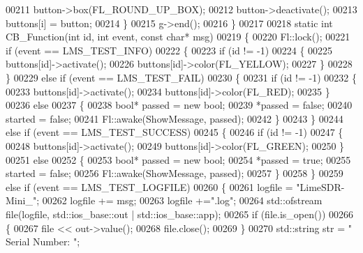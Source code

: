\begin{DoxyCode}
00211         button->box(FL\_ROUND\_UP\_BOX);
00212         button->deactivate();
00213         buttons[i] = button;
00214     \}
00215     g->end();
00216 \}
00217 
00218 \textcolor{keyword}{static} \textcolor{keywordtype}{int} CB\_Function(\textcolor{keywordtype}{int} \textcolor{keywordtype}{id}, \textcolor{keywordtype}{int} event, \textcolor{keyword}{const} \textcolor{keywordtype}{char}* msg)
00219 \{
00220     Fl::lock();
00221     \textcolor{keywordflow}{if} (event == LMS_TEST_INFO)
00222     \{
00223         \textcolor{keywordflow}{if} (\textcolor{keywordtype}{id} != -1)
00224         \{
00225             buttons[id]->activate();
00226             buttons[id]->color(FL\_YELLOW);
00227         \}
00228     \}
00229     \textcolor{keywordflow}{else} \textcolor{keywordflow}{if} (event == LMS_TEST_FAIL)
00230     \{
00231         \textcolor{keywordflow}{if} (\textcolor{keywordtype}{id} != -1)
00232         \{
00233             buttons[id]->activate();
00234             buttons[id]->color(FL\_RED);
00235         \}
00236         \textcolor{keywordflow}{else}
00237         \{
00238             \textcolor{keywordtype}{bool}* passed = \textcolor{keyword}{new} bool;
00239             *passed = \textcolor{keyword}{false};
00240             started = \textcolor{keyword}{false};
00241             Fl::awake(ShowMessage, passed);
00242         \}
00243     \}
00244     \textcolor{keywordflow}{else} \textcolor{keywordflow}{if} (event == LMS_TEST_SUCCESS)
00245     \{
00246         \textcolor{keywordflow}{if} (\textcolor{keywordtype}{id} != -1)
00247         \{
00248             buttons[id]->activate();
00249             buttons[id]->color(FL\_GREEN);
00250         \}
00251         \textcolor{keywordflow}{else}
00252         \{
00253             \textcolor{keywordtype}{bool}* passed = \textcolor{keyword}{new} bool;
00254             *passed = \textcolor{keyword}{true};
00255             started = \textcolor{keyword}{false};
00256             Fl::awake(ShowMessage, passed);
00257         \}
00258     \}
00259     \textcolor{keywordflow}{else} \textcolor{keywordflow}{if} (event == LMS_TEST_LOGFILE)
00260     \{
00261         logfile = \textcolor{stringliteral}{"LimeSDR-Mini\_"};
00262         logfile += msg;
00263         logfile +=\textcolor{stringliteral}{".log"};
00264         std::ofstream file(logfile, std::ios\_base::out | std::ios\_base::app);
00265         \textcolor{keywordflow}{if} (file.is\_open())
00266         \{
00267             file << out->value();
00268             file.close();
00269         \}
00270         std::string str = \textcolor{stringliteral}{"  Serial Number: "};

\end{DoxyCode}

